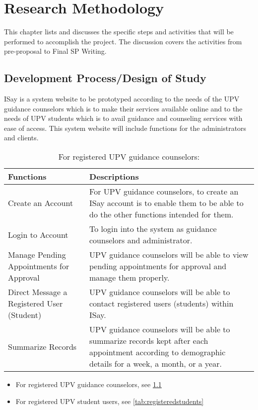 \chapter{Research Methodology}
This chapter lists and discusses the specific steps and activities that will be performed to accomplish the project. 
The discussion covers the activities from pre-proposal to Final SP Writing.

\section{Development Process/Design of Study }
ISay is a system website to be prototyped according to the needs of the UPV guidance counselors which is to make their services available online and to the needs of UPV students which is to avail guidance and counseling services with ease of access. This system website will include functions for the administrators and clients. 

\begin{table}   %
\centering
\caption{For registered UPV guidance counselors:} \vspace{0.25em}
\begin{tabular}{|p{2in}|p{4in}|} \hline
\centering Functions & Descriptions\\ \hline
Create an Account       &    For UPV guidance counselors, to create an ISay account is to enable them to be able to do the other functions intended for them. \\ \hline
Login to Account  &  To login into the system as guidance counselors and administrator.\\ \hline
Manage Pending Appointments for Approval  & UPV guidance counselors will be able to view pending appointments for approval and manage them properly. \\ \hline
Direct Message a Registered User (Student)       &    UPV guidance counselors will be able to contact registered users (students) within ISay.  \\ \hline
Summarize Records & UPV guidance counselors will be able to summarize records kept after each appointment according to demographic details for a week, a month, or a year. \\ \hline
\end{tabular}
\label{tab:registeredcounselors}
\end{table}

\begin{itemize}
\item For registered UPV guidance counselors, see \ref{tab:registeredcounselors}
\item For registered UPV student users, see \ref{tab:registeredstudents}
\end{itemize}

